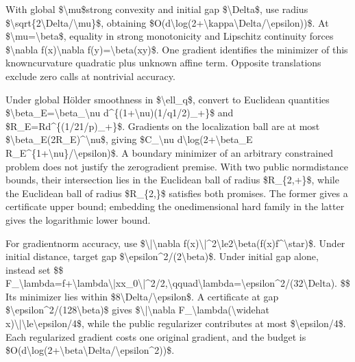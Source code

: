 \documentclass[10pt,a4paper]{article}
\begin{document}
With global \$\textbackslash{}mu\$strong convexity and initial gap \$\textbackslash{}Delta\$, use radius \$\textbackslash{}sqrt\{2\textbackslash{}Delta/\textbackslash{}mu\}\$, obtaining \$O(d\textbackslash{}log(2+\textbackslash{}kappa\textbackslash{}Delta/\textbackslash{}epsilon))\$. At \$\textbackslash{}mu=\textbackslash{}beta\$, equality in strong monotonicity and Lipschitz continuity forces \$\textbackslash{}nabla f(x)\textbackslash{}nabla f(y)=\textbackslash{}beta(xy)\$. One gradient identifies the minimizer of this knowncurvature quadratic plus unknown affine term. Opposite translations exclude zero calls at nontrivial accuracy.

Under global Hölder smoothness in \$\textbackslash{}ell\_q\$, convert to Euclidean quantities
\$\textbackslash{}beta\_E=\textbackslash{}beta\_\textbackslash{}nu d\textasciicircum{}\{(1+\textbackslash{}nu)(1/q1/2)\_+\}\$ and
\$R\_E=Rd\textasciicircum{}\{(1/21/p)\_+\}\$. Gradients on the localization ball are at most \$\textbackslash{}beta\_E(2R\_E)\textasciicircum{}\textbackslash{}nu\$, giving
\$C\_\textbackslash{}nu d\textbackslash{}log(2+\textbackslash{}beta\_E R\_E\textasciicircum{}\{1+\textbackslash{}nu\}/\textbackslash{}epsilon)\$.
A boundary minimizer of an arbitrary constrained problem does not justify the zerogradient premise. With two public normdistance bounds, their intersection lies in the Euclidean ball of radius \$R\_\{2,+\}\$, while the Euclidean ball of radius \$R\_\{2,\}\$ satisfies both promises. The former gives a certificate upper bound; embedding the onedimensional hard family in the latter gives the logarithmic lower bound.

For gradientnorm accuracy, use \$\textbackslash{}|\textbackslash{}nabla f(x)\textbackslash{}|\textasciicircum{}2\textbackslash{}le2\textbackslash{}beta(f(x)f\textasciicircum{}\textbackslash{}star)\$. Under initial distance, target gap \$\textbackslash{}epsilon\textasciicircum{}2/(2\textbackslash{}beta)\$. Under initial gap alone, instead set
\$\$
F\_\textbackslash{}lambda=f+\textbackslash{}lambda\textbackslash{}|xx\allowbreak{}\_0\textbackslash{}|\textasciicircum{}2/2,\textbackslash{}qquad\textbackslash{}lambda=\textbackslash{}\allowbreak{}epsilon\textasciicircum{}2/(32\textbackslash{}Delta).
\$\$
Its minimizer lies within \$8\textbackslash{}Delta/\textbackslash{}epsilon\$. A certificate at gap \$\textbackslash{}epsilon\textasciicircum{}2/(128\textbackslash{}beta)\$ gives \$\textbackslash{}|\textbackslash{}nabla F\_\textbackslash{}lambda(\textbackslash{}widehat x)\textbackslash{}|\textbackslash{}le\textbackslash{}epsilon/4\$, while the public regularizer contributes at most \$\textbackslash{}epsilon/4\$. Each regularized gradient costs one original gradient, and the budget is \$O(d\textbackslash{}log(2+\textbackslash{}beta\textbackslash{}Delta/\textbackslash{}epsilon\textasciicircum{}2))\$.
\end{document}
